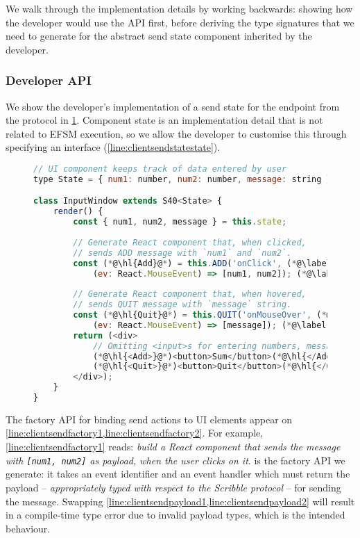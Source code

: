 We walk through the implementation details by working backwards:
showing how the developer would use the API first,
before deriving the type signatures that we need to
generate for the abstract send state component inherited by the developer.

\subsubsection{Developer API}

We show the developer's implementation 
of a send state for the  endpoint
from the  protocol in \cref{lst:adderclientsenddev}.
Component state is an implementation detail 
that is not related to EFSM execution, so we allow
the developer to customise this through specifying an 
interface (\cref{line:clientsendstatestate}).

\begin{figure}[!h]
\begin{lstlisting}[language=javascript,tabsize=2]
// UI component keeps track of data entered by user
type State = { num1: number, num2: number, message: string }; (*@\label{line:clientsendstatestate}@*)

class InputWindow extends S40<State> {
	render() {
		const { num1, num2, message } = this.state;
	
		// Generate React component that, when clicked,
		// sends ADD message with `num1` and `num2`.
		const (*@\hl{Add}@*) = this.ADD('onClick', (*@\label{line:clientsendfactory1}@*)
			(ev: React.MouseEvent) => [num1, num2]); (*@\label{line:clientsendpayload1}@*)
			
		// Generate React component that, when hovered,
		// sends QUIT message with `message` string.
		const (*@\hl{Quit}@*) = this.QUIT('onMouseOver', (*@\label{line:clientsendfactory2}@*)
			(ev: React.MouseEvent) => [message]); (*@\label{line:clientsendpayload2}@*)
		return (<div>
			// Omitting <input>s for entering numbers, message
			(*@\hl{<Add>}@*)<button>Sum</button>(*@\hl{</Add>}@*)
			(*@\hl{<Quit>}@*)<button>Quit</button>(*@\hl{</Quit>}@*)
		</div>);
	}
}
\end{lstlisting}
\label{lst:adderclientsenddev}
\end{figure}

The factory API for binding send actions to UI elements appear on
\cref{line:clientsendfactory1,line:clientsendfactory2}.
For example, \cref{line:clientsendfactory1} reads: 
\textit{build a React component that sends the 
message with \texttt{[num1, num2]} as payload,
when the user clicks on it}.
 is the factory API we generate: it takes an event identifier
and an event handler which must return the payload 
-- \textit{appropriately typed with respect to the Scribble protocol} -- 
for sending the  message.
Swapping \cref{line:clientsendpayload1,line:clientsendpayload2}
will result in a compile-time type error due to invalid 
payload types, which is the intended behaviour.

